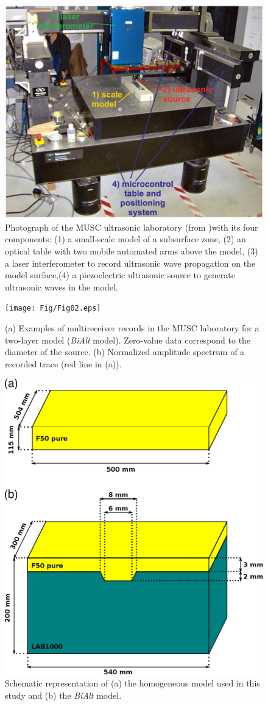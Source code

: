 \documentclass[extra,mreferee]{gji}
\newcommand{\bialt}{\textit{BiAlt} }
\begin{document}
\begin{figure}
\centering
\includegraphics[width=0.50\columnwidth]{Fig/Fig01.eps}
\caption{Photograph of the MUSC ultrasonic laboratory (from \cite{bretaudeau2013fwi} )with its four components: (1) a small-scale model of a subsurface zone, (2) an optical table with two mobile automated arms above the model, (3) a laser interferometer to record ultrasonic wave propagation on the model surface,(4) a piezoelectric ultrasonic source to generate ultrasonic waves in the model.}
\label{Fig:Fig01}
\end{figure}

\clearpage
\newpage

\begin{figure}
\centering
\texttt{[image: Fig/Fig02.eps]}
\caption{(a) Examples of multireceiver records in the MUSC laboratory for a two-layer model (\bialt model). Zero-value data correspond to the diameter of the source. (b) Normalized amplitude spectrum of a recorded trace (red line in (a)).}
\label{Fig:Fig02}
\end{figure}

\clearpage
\newpage

\begin{figure}
\centering
\includegraphics[width=0.50\columnwidth]{Fig/Fig03.eps}
\caption{Schematic representation of (a) the homogeneous model used in this study and (b) the \bialt model.}
\label{Fig:Fig03}
\end{figure}
\end{document}

